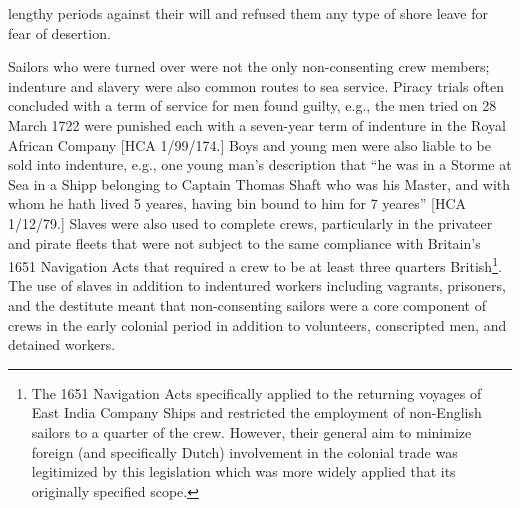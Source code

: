 \begin{styleStandard}
lengthy periods against their will and refused them any type of shore leave for fear of desertion. 
\end{styleStandard}

\begin{styleStandard}
Sailors who were turned over were not the only non-consenting crew members; indenture and slavery were also common routes to sea service. Piracy trials often concluded with a term of service for men found guilty, e.g., the men tried on 28 March 1722 were punished each with a seven-year term of indenture in the Royal African Company [HCA 1/99/174.] Boys and young men were also liable to be sold into indenture, e.g., one young man’s description that “he was in a Storme at Sea in a Shipp belonging to Captain Thomas Shaft who was his Master, and with whom he hath lived 5 yeares, having bin bound to him for 7 yeares” [HCA 1/12/79.] Slaves were also used to complete crews, particularly in the privateer and pirate fleets that were not subject to the same compliance with Britain's 1651 Navigation Acts that required a crew to be at least three quarters British\footnote{ The 1651 Navigation Acts specifically applied to the returning voyages of East India Company Ships and restricted the employment of non-English sailors to a quarter of the crew. However, their general aim to minimize foreign (and specifically Dutch) involvement in the colonial trade was legitimized by this legislation which was more widely applied that its originally specified scope. }. The use of slaves in addition to indentured workers including vagrants, prisoners, and the destitute meant that non-consenting sailors were a core component of crews in the early colonial period in addition to volunteers, conscripted men, and detained workers. 
\end{styleStandard}


